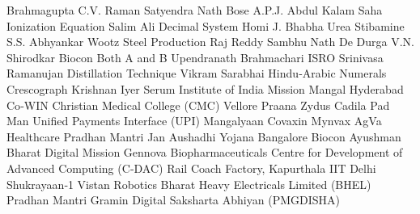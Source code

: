 \answerkey
{} Brahmagupta
 C.V. Raman
 Satyendra Nath Bose
 A.P.J. Abdul Kalam
 Saha Ionization Equation
 Salim Ali
 Decimal System
 Homi J. Bhabha
 Urea Stibamine
 S.S. Abhyankar
 Wootz Steel Production
 Raj Reddy
 Sambhu Nath De
 Durga
 V.N. Shirodkar
 Biocon
 Both A and B
 Upendranath Brahmachari
 ISRO
 Srinivasa Ramanujan
 Distillation Technique
 Vikram Sarabhai
 Hindu‑Arabic Numerals
 Crescograph
 Krishnan Iyer
 Serum Institute of India
 Mission Mangal
 Hyderabad
 Co‑WIN
 Christian Medical College (CMC) Vellore
 Praana
 Zydus Cadila
 Pad Man
 Unified Payments Interface (UPI)
 Mangalyaan
 Covaxin
 Mynvax
 AgVa Healthcare
 Pradhan Mantri Jan Aushadhi Yojana
 Bangalore
 Biocon
 Ayushman Bharat Digital Mission
 Gennova Biopharmaceuticals
 Centre for Development of Advanced Computing (C‑DAC)
 Rail Coach Factory, Kapurthala
 IIT Delhi
 Shukrayaan‑1
 Vistan Robotics
 Bharat Heavy Electricals Limited (BHEL)
 Pradhan Mantri Gramin Digital Saksharta Abhiyan (PMGDISHA)
\endanswerkey
